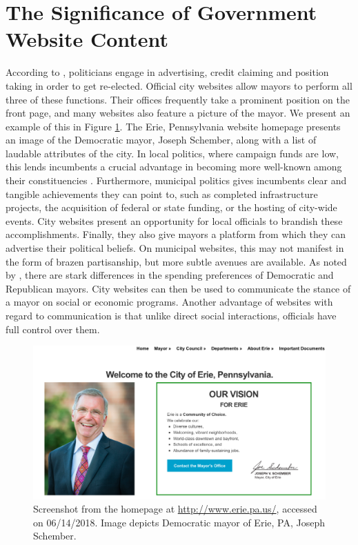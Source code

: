 \documentclass[11pt]{article}
\begin{document}
\section{The Significance of Government Website Content}


 According to \cite{Mayhew1974}, politicians engage in advertising, credit claiming and position taking in order to get re-elected. Official city websites allow mayors to perform all three of these functions. Their offices frequently take a prominent position on the front page, and many websites also feature a picture of the mayor. We present an example of this in Figure \ref{fig:eriemayor}. The Erie, Pennsylvania website homepage presents an image of the Democratic mayor, Joseph Schember, along with a list of laudable attributes of the city. In local politics, where campaign funds are low, this lends incumbents a crucial advantage in becoming more well-known among their constituencies \citep{stanyer2008elected}. Furthermore, municipal politics gives incumbents clear and tangible achievements they can point to, such as completed infrastructure projects, the acquisition of federal or state funding, or the hosting of city-wide events. City websites present an opportunity for local officials to brandish these accomplishments. Finally, they also give mayors a platform from which they can advertise their political beliefs. On municipal websites, this may not manifest in the form of brazen partisanship, but more subtle avenues are available. As noted by \cite{einstein2016mayors}, there are stark differences in the spending preferences of Democratic and Republican mayors. City websites can then be used to communicate the stance of a mayor on social or economic programs. Another advantage of websites with regard to communication is that unlike direct social interactions, officials have full control over them.
 
\begin{figure}
\centering
\includegraphics[scale=0.35]{figures/eriemayor}
\caption{Screenshot from the homepage at \url{http://www.erie.pa.us/}, accessed on 06/14/2018. Image depicts  Democratic mayor of Erie, PA, Joseph Schember.}
\label{fig:eriemayor}
\end{figure}
\end{document}
